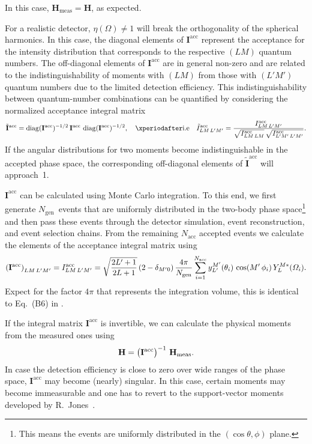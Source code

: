 In this case, $\mathbf{H}_\text{meas} = \mathbf{H}$, as expected.

For a realistic detector, $\eta(\Omega) \neq 1$ will break the
orthogonality of the spherical harmonics.  In this case, the diagonal
elements of $\mathbf{I}^\text{acc}$ represent the acceptance for the
intensity distribution that corresponds to the respective $(L M)$
quantum numbers.  The off-diagonal elements of $\mathbf{I}^\text{acc}$
are in general non-zero and are related to the indistinguishability of
moments with $(L M)$ from those with $(L' M')$ quantum numbers due to
the limited detection efficiency.  This indistinguishability between
quantum-number combinations can be quantified by considering the
normalized acceptance integral matrix
\begin{equation}
  \tilde{\mathbf{I}}^\text{acc}
  = \diag(\mathbf{I}^\text{acc})^{-1/2}\, \mathbf{I}^\text{acc}\, \diag(\mathbf{I}^\text{acc})^{-1/2},
  \quad\text{\ie}\quad
  \tilde{I}^\text{acc}_{L M\, L' M'}
  = \frac{I^\text{acc}_{L M\, L' M'}}{\sqrt{I^\text{acc}_{L M\, L M}}\, \sqrt{I^\text{acc}_{L' M'\, L' M'}}}.
\end{equation}
If the angular distributions for two moments become indistinguishable
in the accepted phase space, the corresponding off-diagonal elements
of $\tilde{\mathbf{I}}^\text{acc}$ will approach~1.

$\mathbf{I}^\text{acc}$ can be calculated using Monte Carlo
integration.  To this end, we first generate $N_\text{gen}$~events
that are uniformly distributed in the two-body phase
space\footnote{This means the events are uniformly distributed in the
$(\cos\theta, \phi)$ plane.} and then pass these events through the
detector simulation, event reconstruction, and event selection chains.
From the remaining $N_\text{acc}$ accepted events we calculate the
elements of the acceptance integral matrix using
\begin{equation}
  \label{eq:diffraction_integral_matrix}
  \rBrk{\mathbf{I}^\text{acc}}_{L M\, L' M'}
  = I^\text{acc}_{L M\, L' M'}
  = \sqrt{\frac{2 L' + 1}{2 L + 1}}\, (2 - \delta_{M' 0})\,
  \frac{4 \pi}{N_\text{gen}} \sum_{i = 1}^{N_\text{acc}} y_{L'}^{M'}(\theta_i)\, \cos(M'\, \phi_i)\, Y_L^{M *}(\Omega_i).
\end{equation}
Expect for the factor $4 \pi$ that represents the integration volume,
this is identical to Eq.~(B6) in .

If the integral matrix $\mathbf{I}^\text{acc}$ is invertible, we can
calculate the physical moments from the measured ones using
\begin{equation}
  \label{eq:diffraction_phys_moments}
  \mathbf{H}
  = \rBrk[1]{\mathbf{I}^\text{acc}}^{-1}\, \mathbf{H}_\text{meas}.
\end{equation}
In case the detection efficiency is close to zero over wide ranges of
the phase space, $\mathbf{I}^\text{acc}$ may become (nearly) singular.
In this case, certain moments may become immeasurable and one has to
revert to the support-vector moments developed by
R.~Jones~\cite{Jones:2023}.


